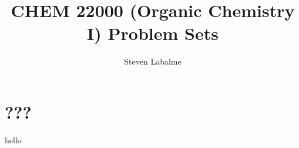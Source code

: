\documentclass[titlepage]{article}
\title{CHEM 22000 (Organic Chemistry I) Problem Sets}
\author{Steven Labalme}
\begin{document}
\maketitle



\tableofcontents
\newpage



\pagestyle{main}
\renewcommand{\leftmark}{Problem Set \thesection}
\section{???}
hello
\end{document}
